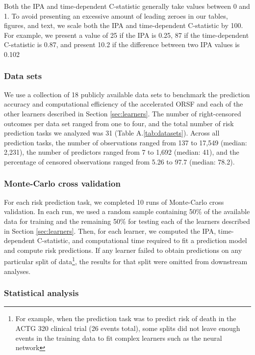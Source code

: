 \documentclass[twoside,11pt]{article}\usepackage[]{graphicx}\usepackage[]{xcolor}
\newcommand{\secref}[1]{Section \ref{#1}}
\newcommand{\tabrefAppendix}[1]{Table A.\ref{#1}}
\begin{document}
Both the IPA and time-dependent C-statistic generally take values between 0 and 1. To avoid presenting an excessive amount of leading zeroes in our tables, figures, and text, we scale both the IPA and time-dependent C-statistic by 100. For example, we present a value of 25 if the IPA is 0.25, 87 if the time-dependent C-statistic is 0.87, and present 10.2 if the difference between two IPA values is 0.102

\subsubsection{Data sets}

We use a collection of 18 publicly available data sets to benchmark the prediction accuracy and computational efficiency of the accelerated ORSF and each of the other learners described in \secref{sec:learners}. The number of right-censored outcomes per data set ranged from one to four, and the total number of risk prediction tasks we analyzed was 31 (\tabrefAppendix{tab:datasets}). Across all prediction tasks, the number of observations ranged from 137 to 17,549 (median: 2,231), the number of predictors ranged from 7 to 1,692 (median: 41), and the percentage of censored observations ranged from 5.26 to 97.7 (median: 78.2).

\subsubsection{Monte-Carlo cross validation}

For each risk prediction task, we completed 10 runs of Monte-Carlo cross validation. In each run, we used a random sample containing 50\% of the available data for training and the remaining 50\% for testing each of the learners described in \secref{sec:learners}. Then, for each learner, we computed the IPA, time-dependent C-statistic, and computational time required to fit a prediction model and compute risk predictions. If any learner failed to obtain predictions on any particular split of data\footnote{For example, when the prediction task was to predict risk of death in the ACTG 320 clinical trial (26 events total), some splits did not leave enough events in the training data to fit complex learners such as the neural network}, the results for that split were omitted from downstream analyses.


\subsubsection{Statistical analysis}
\end{document}

